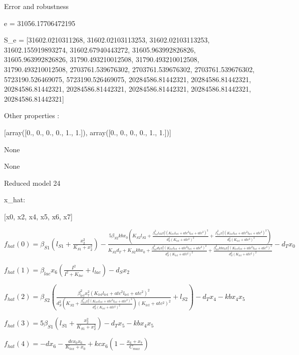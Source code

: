 Error and robustness 


e = 31056.17706472195

S_e = [31602.0210311268, 31602.02103113253, 31602.02103113253, 31602.155919893274, 31602.67940443272, 31605.963992826826, 31605.963992826826, 31790.493210012508, 31790.493210012508, 31790.493210012508, 2703761.539676302, 2703761.539676302, 2703761.539676302, 5723190.526469075, 5723190.526469075, 20284586.81442321, 20284586.81442321, 20284586.81442321, 20284586.81442321, 20284586.81442321, 20284586.81442321, 20284586.81442321]

Other properties :


[array([0., 0., 0., 0., 1., 1.]), array([0., 0., 0., 0., 1., 1.])]

None

None

Reduced model 24

x_{hat}: 

[x0, x2, x4, x5, x6, x7]


$f_{hat}(0)=\beta_{S1} \left(l_{S1} + \frac{x_{2}^{2}}{K_{S1} + x_{2}^{2}}\right) - \frac{5 \beta_{S2} kb x_{0} \left(K_{S2} l_{S2} + \frac{\beta_{tet}^{2} l_{S2} x_{7}^{2} \left(K_{tet} l_{tet} + atc^{2} l_{tet} + atc^{2}\right)^{2}}{d_{S}^{2} \left(K_{tet} + atc^{2}\right)^{2}} + \frac{\beta_{tet}^{2} x_{7}^{2} \left(K_{tet} l_{tet} + atc^{2} l_{tet} + atc^{2}\right)^{2}}{d_{S}^{2} \left(K_{tet} + atc^{2}\right)^{2}}\right)}{K_{S2} d_{T} + K_{S2} kb x_{0} + \frac{\beta_{tet}^{2} d_{T} x_{7}^{2} \left(K_{tet} l_{tet} + atc^{2} l_{tet} + atc^{2}\right)^{2}}{d_{S}^{2} \left(K_{tet} + atc^{2}\right)^{2}} + \frac{\beta_{tet}^{2} kb x_{0} x_{7}^{2} \left(K_{tet} l_{tet} + atc^{2} l_{tet} + atc^{2}\right)^{2}}{d_{S}^{2} \left(K_{tet} + atc^{2}\right)^{2}}} - d_{T} x_{0}$


$f_{hat}(1)=\beta_{lac} x_{6} \left(\frac{I^{2}}{I^{2} + K_{lac}} + l_{lac}\right) - d_{S} x_{2}$


$f_{hat}(2)=\beta_{S2} \left(\frac{\beta_{tet}^{2} x_{7}^{2} \left(K_{tet} l_{tet} + atc^{2} l_{tet} + atc^{2}\right)^{2}}{d_{S}^{2} \left(K_{S2} + \frac{\beta_{tet}^{2} x_{7}^{2} \left(K_{tet} l_{tet} + atc^{2} l_{tet} + atc^{2}\right)^{2}}{d_{S}^{2} \left(K_{tet} + atc^{2}\right)^{2}}\right) \left(K_{tet} + atc^{2}\right)^{2}} + l_{S2}\right) - d_{T} x_{4} - kb x_{4} x_{5}$


$f_{hat}(3)=5 \beta_{S1} \left(l_{S1} + \frac{x_{2}^{2}}{K_{S1} + x_{2}^{2}}\right) - d_{T} x_{5} - kb x_{4} x_{5}$


$f_{hat}(4)=- d x_{6} - \frac{dc x_{0} x_{6}}{K_{tox} + x_{0}} + kc x_{6} \left(1 - \frac{x_{6} + x_{7}}{C_{max}}\right)$


